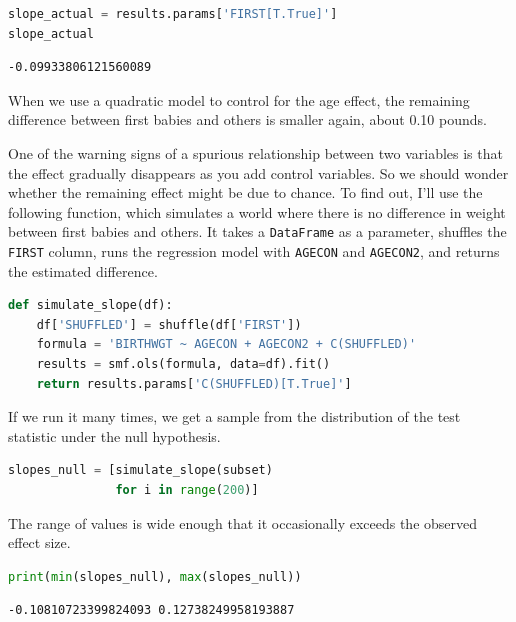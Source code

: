 \begin{lstlisting}[language=Python,style=source]
slope_actual = results.params['FIRST[T.True]']
slope_actual
\end{lstlisting}

\begin{lstlisting}[style=output]
-0.09933806121560089
\end{lstlisting}

When we use a quadratic model to control for the age effect, the
remaining difference between first babies and others is smaller again,
about 0.10 pounds.

One of the warning signs of a spurious relationship between two
variables is that the effect gradually disappears as you add control
variables. So we should wonder whether the remaining effect might be due
to chance. To find out, I'll use the following function, which simulates
a world where there is no difference in weight between first babies and
others. It takes a \passthrough{\lstinline!DataFrame!} as a parameter,
shuffles the \passthrough{\lstinline!FIRST!} column, runs the regression
model with \passthrough{\lstinline!AGECON!} and
\passthrough{\lstinline!AGECON2!}, and returns the estimated difference.

\begin{lstlisting}[language=Python,style=source]
def simulate_slope(df):
    df['SHUFFLED'] = shuffle(df['FIRST'])
    formula = 'BIRTHWGT ~ AGECON + AGECON2 + C(SHUFFLED)'
    results = smf.ols(formula, data=df).fit()
    return results.params['C(SHUFFLED)[T.True]']
\end{lstlisting}

If we run it many times, we get a sample from the distribution of the
test statistic under the null hypothesis.

\begin{lstlisting}[language=Python,style=source]
slopes_null = [simulate_slope(subset)
               for i in range(200)]
\end{lstlisting}

The range of values is wide enough that it occasionally exceeds the
observed effect size.

\begin{lstlisting}[language=Python,style=source]
print(min(slopes_null), max(slopes_null))
\end{lstlisting}

\begin{lstlisting}[style=output]
-0.10810723399824093 0.12738249958193887
\end{lstlisting}


